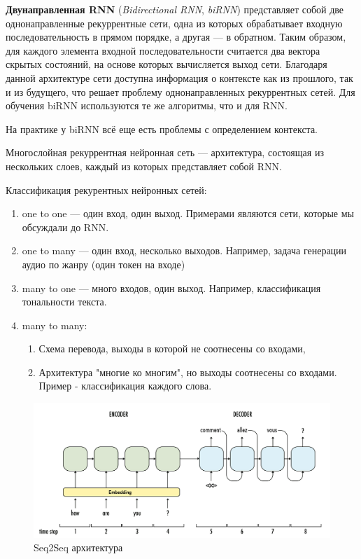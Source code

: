 \begin{definition}
    \textbf{Двунаправленная RNN} (\textit{Bidirectional RNN}, \textit{biRNN}) представляет собой две однонаправленные рекуррентные сети, одна из которых обрабатывает входную последовательность в прямом порядке, а другая — в обратном. Таким образом, для каждого элемента входной последовательности считается два вектора скрытых состояний, на основе которых вычисляется выход сети. Благодаря данной архитектуре сети доступна информация о контексте как из прошлого, так и из будущего, что решает проблему однонаправленных рекуррентных сетей. Для обучения biRNN используются те же алгоритмы, что и для RNN.
\end{definition}

\begin{remark}
    На практике у biRNN всё еще есть проблемы с определением контекста.
\end{remark}

\begin{definition}
    Многослойная рекуррентная нейронная сеть --- архитектура, состоящая из нескольких слоев, каждый из которых представляет собой RNN.
\end{definition}

Классификация рекурентных нейронных сетей:
\begin{enumerate}
    \item one to one --- один вход, один выход. Примерами являются сети, которые мы обсуждали до RNN.
    \item one to many --- один вход, несколько выходов. Например, задача генерации аудио по жанру (один токен на входе)
    \item many to one --- много входов, один выход. Например, классификация тональности текста.
    \item many to many:
    \begin{enumerate}
        \item Схема перевода, выходы в которой не соотнесены со входами,
        \item Архитектура "многие ко многим", но выходы соотнесены со входами. Пример - классификация каждого слова.
    \end{enumerate}
\end{enumerate}

\begin{figure}
    \centering
    \includegraphics[scale=0.25]{images/seq2seq.png}
    \caption{Seq2Seq архитектура}
\end{figure}

